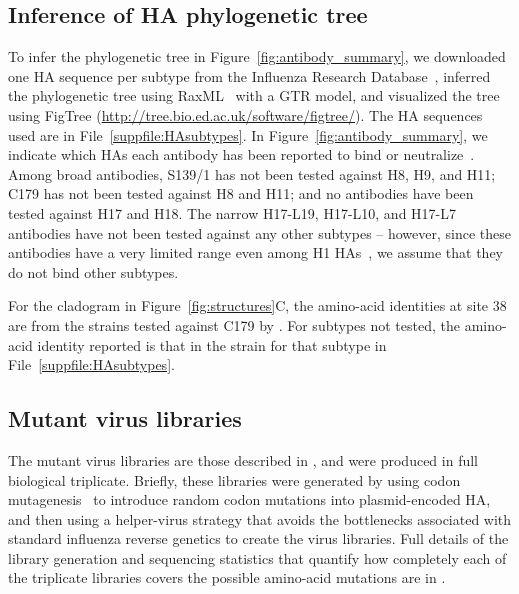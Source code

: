 \documentclass[11pt]{article}
\begin{document}
\subsection*{Inference of HA phylogenetic tree}
To infer the phylogenetic tree in Figure~\ref{fig:antibody_summary}, we downloaded one HA sequence per subtype from the Influenza Research Database~\citep{zhang2017influenza}, inferred the phylogenetic tree using RaxML~\citep{stamatakis2014raxml} with a GTR model, and visualized the tree using FigTree (\url{http://tree.bio.ed.ac.uk/software/figtree/}). 
The HA sequences used are in File~\ref{suppfile:HAsubtypes}. 
In Figure~\ref{fig:antibody_summary}, we indicate which HAs each antibody has been reported to bind or neutralize~\citep{yoshida2009cross, lee2012heterosubtypic, okuno1993common, dreyfus2013structure, corti2011neutralizing}. 
Among broad antibodies, S139/1 has not been tested against H8, H9, and H11; C179 has not been tested against H8 and H11; and no antibodies have been tested against H17 and H18.
The narrow H17-L19, H17-L10, and H17-L7 antibodies have not been tested against any other subtypes -- however, since these antibodies have a very limited range even among H1 HAs~\citep{caton1982antigenic}, we assume that they do not bind other subtypes.

For the cladogram in Figure~\ref{fig:structures}C, the amino-acid identities at site 38 are from the strains tested against C179 by \citet{dreyfus2013structure}. 
For subtypes not tested, the amino-acid identity reported is that in the strain for that subtype in File~\ref{suppfile:HAsubtypes}.

\subsection*{Mutant virus libraries}
The mutant virus libraries are those described in \citet{doud2016accurate}, and were produced in full biological triplicate.
Briefly, these libraries were generated by using codon mutagenesis~\citep{bloom2014experimentally} to introduce random codon mutations into plasmid-encoded HA, and then using a helper-virus strategy that avoids the bottlenecks associated with standard influenza reverse genetics to create the virus libraries.
Full details of the library generation and sequencing statistics that quantify how completely each of the triplicate libraries covers the possible amino-acid mutations are in \citet{doud2016accurate}.
\end{document}
